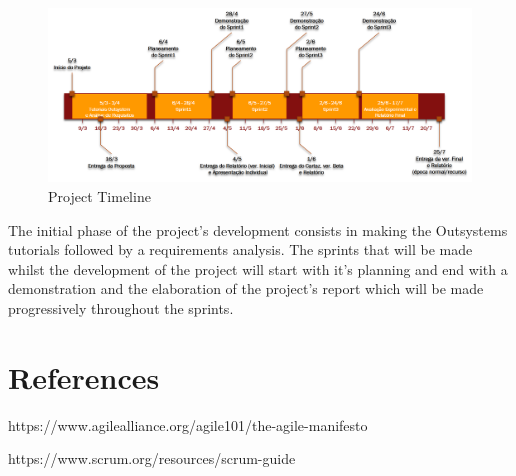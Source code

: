 \documentclass[a4paper,openright,12pt]{report}
\begin{document}
\begin{figure}[h]
  \includegraphics[width=\linewidth]{./figures/Timeline Projeto LEIC.png}
  \caption{Project Timeline}\label{fig:schedule}
\end{figure}

The initial phase of the project's development consists in making the Outsystems tutorials followed by a requirements analysis. The sprints that will be made whilst the development of the project will start with it's planning and end with a demonstration and the elaboration of the project's report which will be made progressively throughout the sprints.

\section*{References}
\begin{enumerate}[label={[\arabic*]}]
  \item https://www.agilealliance.org/agile101/the-agile-manifesto
  \item https://www.scrum.org/resources/scrum-guide
\end{enumerate}
\end{document}
